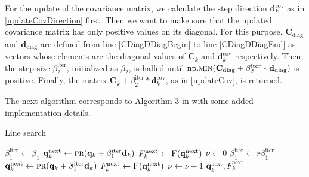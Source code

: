 For the update of the covariance matrix, we calculate the step direction $\mathbf{d}^\mathrm{cov}_k$ as in \ref{updateCovDirection} first. Then we want to make sure that the updated covariance matrix has only positive values on its diagonal. For this purpose, $\mathbf{C}_\mathrm{diag}$ and $\mathbf{d}_\mathrm{diag}$ are defined from line \ref{CDiagDDiagBegin} to line \ref{CDiagDDiagEnd} as vectors whose elements are the diagonal values of $\mathbf{C}_k$ and $\mathbf{d}^\mathrm{cov}_k$ respectively. Then, the step size $\beta^\mathrm{iter}_2$, initialized as $\beta_2$, is halfed until $\mathrm{np.}\Call{min}{\mathbf{C}_\mathrm{diag}+\beta^\mathrm{iter}_2*\mathbf{d}_\mathrm{diag}}$ is positive. Finally, the matrix $\mathbf{C}_k+\beta^\mathrm{iter}_2*\mathbf{d}^\mathrm{cov}_k$, as in \eqref{updateCov}, is returned.

The next algorithm corresponds to Algorithm 3 in \cite{Keil2022-dj} with some added implementation details.

\begin{algorithm}[H]%
\caption{\label{LineSearchAlg}Line search}
\begin{algorithmic}[1]
\State $\beta^\mathrm{iter}_1 \gets \beta_1$
\State $\mathbf{q}^\mathrm{next}_k \gets \Call{pr}{\mathbf{q}_k+\beta^\mathrm{iter}_1\mathbf{d}_k}$
\State \label{LineSearchAlgFOMCall1}$F^\mathrm{next}_k \gets \Call{F}{\mathbf{q}^\mathrm{next}_k}$
\State $\nu \gets 0$
\State $\beta^\mathrm{iter}_1 \gets r\beta^\mathrm{iter}_1$
\State $\mathbf{q}^\mathrm{next}_k \gets \Call{pr}{\mathbf{q}_k+\beta^\mathrm{iter}_1\mathbf{d}_k}$
\State \label{LineSearchAlgFOMCall2}$F^\mathrm{next}_k \gets \Call{F}{\mathbf{q}^\mathrm{next}_k}$
\State $\nu \gets \nu+1$
\EndWhile
\Return $\mathbf{q}^\mathrm{next}_k, F^\mathrm{next}_k$
\EndFunction
\end{algorithmic}
\end{algorithm}

